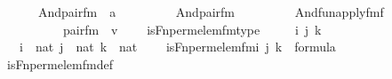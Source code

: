 \begin{isabellebody}
\ \ \ \ \ \ And{\isacharparenleft}{\kern0pt}pair{\isacharunderscore}{\kern0pt}fm{\isacharparenleft}{\kern0pt}{}{\isacharcomma}{\kern0pt}\ {}{\isacharcomma}{\kern0pt}\ a\ {\isacharhash}{\kern0pt}{\isacharplus}{\kern0pt}\ {}{\isacharparenright}{\kern0pt}{\isacharcomma}{\kern0pt}\ \isanewline
\ \ \ \ \ \ And{\isacharparenleft}{\kern0pt}pair{\isacharunderscore}{\kern0pt}fm{\isacharparenleft}{\kern0pt}{}{\isacharcomma}{\kern0pt}\ {}{\isacharcomma}{\kern0pt}\ {}{\isacharparenright}{\kern0pt}{\isacharcomma}{\kern0pt}\ \isanewline
\ \ \ \ \ \ And{\isacharparenleft}{\kern0pt}fun{\isacharunderscore}{\kern0pt}apply{\isacharunderscore}{\kern0pt}fm{\isacharparenleft}{\kern0pt}f\ {\isacharhash}{\kern0pt}{\isacharplus}{\kern0pt}\ {}{\isacharcomma}{\kern0pt}\ {}{\isacharcomma}{\kern0pt}\ {}{\isacharparenright}{\kern0pt}{\isacharcomma}{\kern0pt}\ \isanewline
\ \ \ \ \ \ \ \ \ \ pair{\isacharunderscore}{\kern0pt}fm{\isacharparenleft}{\kern0pt}{}{\isacharcomma}{\kern0pt}\ {}{\isacharcomma}{\kern0pt}\ v\ {\isacharhash}{\kern0pt}{\isacharplus}{\kern0pt}\ {}{\isacharparenright}{\kern0pt}{\isacharparenright}{\kern0pt}{\isacharparenright}{\kern0pt}{\isacharparenright}{\kern0pt}{\isacharparenright}{\kern0pt}{\isacharparenright}{\kern0pt}{\isacharparenright}{\kern0pt}{\isacharparenright}{\kern0pt}{\isacharparenright}{\kern0pt}{\isacharparenright}{\kern0pt}{\isacharparenright}{\kern0pt}{\isachardoublequoteclose}\ \isanewline
\isanewline
{}\isamarkupfalse%
\ is{\isacharunderscore}{\kern0pt}Fn{\isacharunderscore}{\kern0pt}perm{\isacharunderscore}{\kern0pt}elem{\isacharunderscore}{\kern0pt}fm{\isacharunderscore}{\kern0pt}type\ {\isacharcolon}{\kern0pt}\ \isanewline
\ \ \ i\ j\ k\isanewline
\ \ \ {\isachardoublequoteopen}i\ {\isasymin}\ nat{\isachardoublequoteclose}\ {\isachardoublequoteopen}j\ {\isasymin}\ nat{\isachardoublequoteclose}\ {\isachardoublequoteopen}k\ {\isasymin}\ nat{\isachardoublequoteclose}\ \isanewline
\ \ \ {\isachardoublequoteopen}is{\isacharunderscore}{\kern0pt}Fn{\isacharunderscore}{\kern0pt}perm{\isacharunderscore}{\kern0pt}elem{\isacharunderscore}{\kern0pt}fm{\isacharparenleft}{\kern0pt}i{\isacharcomma}{\kern0pt}\ j{\isacharcomma}{\kern0pt}\ k{\isacharparenright}{\kern0pt}\ {\isasymin}\ formula{\isachardoublequoteclose}\ \isanewline
%
\isadelimproof
\ \ %
\endisadelimproof
%
\isatagproof
{}\isamarkupfalse%
\ is{\isacharunderscore}{\kern0pt}Fn{\isacharunderscore}{\kern0pt}perm{\isacharunderscore}{\kern0pt}elem{\isacharunderscore}{\kern0pt}fm{\isacharunderscore}{\kern0pt}def\ \isanewline

\end{isabellebody}
